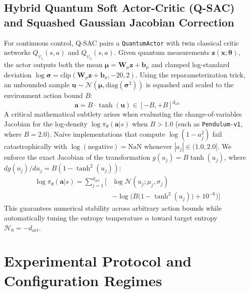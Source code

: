 \documentclass[conference]{IEEEtran}
\begin{document}
\subsection{Hybrid Quantum Soft Actor-Critic (Q-SAC) and Squashed Gaussian Jacobian Correction}
For continuous control, Q-SAC pairs a \texttt{QuantumActor} with twin classical critic networks $Q_{\psi_1}(s,a)$ and $Q_{\psi_2}(s,a)$. Given quantum measurements $\mathbf{z}(\mathbf{x}; \boldsymbol{\theta})$, the actor outputs both the mean $\boldsymbol{\mu} = \mathbf{W}_\mu \mathbf{z} + \mathbf{b}_\mu$ and clamped log-standard deviation $\log \boldsymbol{\sigma} = \text{clip}(\mathbf{W}_\sigma \mathbf{z} + \mathbf{b}_\sigma, -20, 2)$. Using the reparameterization trick, an unbounded sample $\mathbf{u} \sim \mathcal{N}(\boldsymbol{\mu}, \text{diag}(\boldsymbol{\sigma}^2))$ is squashed and scaled to the environment action bound $B$:
\begin{equation}
\mathbf{a} = B \cdot \tanh(\mathbf{u}) \in [-B, +B]^{d_{\text{act}}}
\end{equation}
A critical mathematical subtlety arises when evaluating the change-of-variables Jacobian for the log-density $\log \pi_\theta(\mathbf{a}|s)$ when $B > 1.0$ (such as \texttt{Pendulum-v1}, where $B = 2.0$). Naive implementations that compute $\log(1 - a_j^2)$ fail catastrophically with $\log(\text{negative}) = \text{NaN}$ whenever $|a_j| \in (1.0, 2.0]$. We enforce the exact Jacobian of the transformation $g(u_j) = B \tanh(u_j)$, where $dg(u_j)/du_j = B(1 - \tanh^2(u_j))$:
\begin{equation}
\begin{aligned}
\log \pi_\theta(\mathbf{a}|s) = \sum_{j=1}^{d_{\text{act}}} \Big[ &\log \mathcal{N}(u_j; \mu_j, \sigma_j) \\
&- \log\!\Big( B \big(1 - \tanh^2(u_j)\big) + 10^{-6} \Big) \Big]
\end{aligned}
\label{eq:sac_jacobian}
\end{equation}
This guarantees numerical stability across arbitrary action bounds while automatically tuning the entropy temperature $\alpha$ toward target entropy $\mathcal{H}_0 = -d_{\text{act}}$.

\section{Experimental Protocol and Configuration Regimes}
\end{document}
